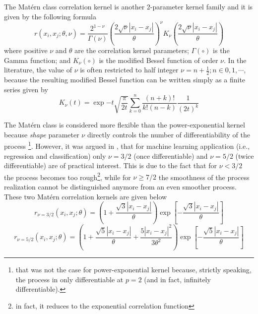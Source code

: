 The Mat\'ern class correlation kernel is another $2$-parameter kernel family and it is given by the following formula \cite{Santner2003,Rasmussen2006}
\begin{equation}
	r(x_i, x_j; \theta, \nu) = \frac{2^{1-\nu}}{\Gamma(\nu)} \left(\frac{2\sqrt{\nu} |x_i - x_j|}{\theta}\right)^\nu K_{\nu}\left(\frac{2\sqrt{\nu} |x_i - x_j|}{\theta}\right)
\label{eq:matern_kernel}
\end{equation}
where positive $\nu$ and $\theta$ are the correlation kernel parameters;
$\Gamma(\circ)$ is the Gamma function;
and $K_\nu (\circ)$ is the modified Bessel function of order $\nu$.
In the literature, the value of $\nu$ is often restricted to half integer $\nu = n + \frac{1}{2}; n \in {0,1,\cdots}$,
because the resulting modified Bessel function can be written simply as a finite series given by
\begin{equation}
	K_\nu(t) = \exp{-t} \sqrt{\frac{\pi}{2t}} \sum_{k = 0}^{n} \frac{(n+k)!}{k! (n-k)} \frac{1}{(2t)^k}
\label{eq:modified_bessel}
\end{equation}

The Mat\'ern class is considered more flexible than the power-exponential kernel because \emph{shape} parameter $\nu$ directly controls the number of differentiability of the process \cite{Stein1989}\footnote{that was not the case for power-exponential kernel because, strictly speaking, the process in only differentiable at $p = 2$ (and in fact, infinitely differentiable).}.
However, it was argued in \cite{Rasmussen2006}, that for machine learning application (i.e., regression and classification) only $\nu = 3/2$ (once differentiable) and $\nu = 5/2$ (twice differentiable) are of practical interest.
This is due to the fact that for $\nu < 3/2$ the process becomes too rough\footnote{in fact, it reduces to the exponential correlation function},
while for $\nu \geq 7/2$ the smoothness of the process realization cannot be distinguished anymore from an even smoother process.
These two Mat\'ern correlation kernels are given below \cite{Roustant2012,Rasmussen2006}
\begin{equation}
	r_{\nu=3/2}(x_i, x_j;\theta) = \left(1 + \frac{\sqrt{3}|x_i - x_j|}{\theta}\right) \exp{\left[-\frac{\sqrt{3} |x_i - x_j|}{\theta}\right]}
\label{eq:matern3_2}
\end{equation}
\begin{equation}
	r_{\nu=5/2}(x_i, x_j;\theta) = \left(1 + \frac{\sqrt{5}|x_i - x_j|}{\theta} + \frac{5|x_i - x_j|^2}{3\theta^2}\right) \exp{\left[-\frac{\sqrt{5} |x_i - x_j|}{\theta}\right]}
\label{eq:matern5_2}
\end{equation}

